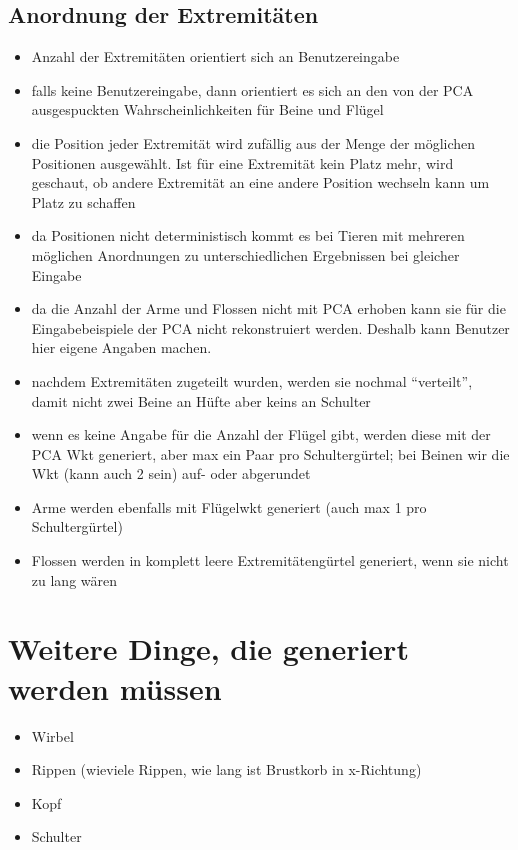 \subsection{Anordnung der Extremitäten}

\begin{itemize}
 \item Anzahl der Extremitäten orientiert sich an Benutzereingabe
 \item falls keine Benutzereingabe, dann orientiert es sich an den von der PCA ausgespuckten Wahrscheinlichkeiten für Beine und Flügel
 \item die Position jeder Extremität wird zufällig aus der Menge der möglichen Positionen ausgewählt. Ist für eine Extremität kein Platz mehr, wird geschaut, ob andere Extremität an eine andere Position wechseln kann um Platz zu schaffen
 \item da Positionen nicht deterministisch kommt es bei Tieren mit mehreren möglichen Anordnungen zu unterschiedlichen Ergebnissen bei gleicher Eingabe
 \item da die Anzahl der Arme und Flossen nicht mit PCA erhoben kann sie für die Eingabebeispiele der PCA nicht rekonstruiert werden. Deshalb kann Benutzer hier eigene Angaben machen.
 \item nachdem Extremitäten zugeteilt wurden, werden sie nochmal "`verteilt"', damit nicht \zb zwei Beine an Hüfte aber keins an Schulter 
 \item wenn es keine Angabe für die Anzahl der Flügel gibt, werden diese mit der PCA Wkt generiert, aber max ein Paar pro Schultergürtel; bei Beinen wir die Wkt (kann auch 2 sein) auf- oder abgerundet
 \item Arme werden ebenfalls mit Flügelwkt generiert (auch max 1 pro Schultergürtel)
 \item Flossen werden in komplett leere Extremitätengürtel generiert, wenn sie nicht zu lang wären
\end{itemize}


\section{Weitere Dinge, die generiert werden müssen}

\begin{itemize}
 \item Wirbel
 \item Rippen (wieviele Rippen, wie lang ist Brustkorb in x-Richtung)
 \item Kopf
 \item Schulter 
\end{itemize}
